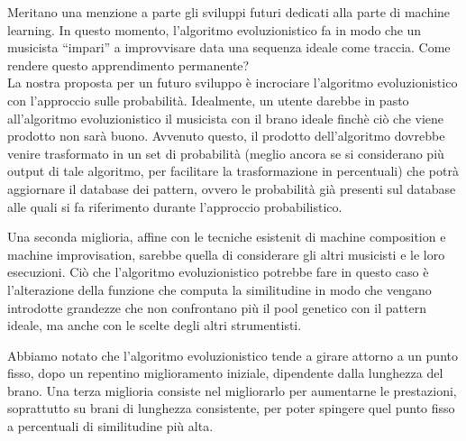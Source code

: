 
Meritano una menzione a parte gli sviluppi futuri dedicati alla parte di machine learning.
In questo momento, l'algoritmo evoluzionistico fa in modo che un musicista ``impari'' a improvvisare data una sequenza ideale come traccia.
Come rendere questo apprendimento permanente?\\
La nostra proposta per un futuro sviluppo è incrociare l'algoritmo evoluzionistico con l'approccio sulle probabilità.
Idealmente, un utente darebbe in pasto all'algoritmo evoluzionistico il musicista con il brano ideale finchè ciò che viene prodotto non sarà buono.
Avvenuto questo, il prodotto dell'algoritmo dovrebbe venire trasformato in un set di probabilità (meglio ancora se si considerano più output di tale algoritmo, per facilitare la trasformazione in percentuali) che potrà aggiornare il database dei pattern, ovvero le probabilità già presenti sul database alle quali si fa riferimento durante l'approccio probabilistico.
\newline

Una seconda miglioria, affine con le tecniche esistenit di machine composition e machine improvisation, sarebbe quella di considerare gli altri musicisti e le loro esecuzioni.
Ciò che l'algoritmo evoluzionistico potrebbe fare in questo caso è l'alterazione della funzione che computa la similitudine in modo che vengano introdotte grandezze che non confrontano più il pool genetico con il pattern ideale, ma anche con le scelte degli altri strumentisti.
\newline

Abbiamo notato che l'algoritmo evoluzionistico tende a girare attorno a un punto fisso, dopo un repentino miglioramento iniziale, dipendente dalla lunghezza del brano.
Una terza miglioria consiste nel migliorarlo per aumentarne le prestazioni, soprattutto su brani di lunghezza consistente, per poter spingere quel punto fisso a percentuali di similitudine più alta.